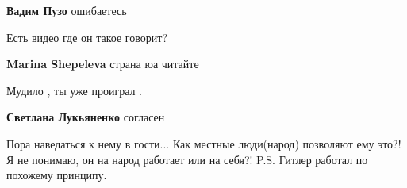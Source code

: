 \begin{itemize}
\begin{itemize}
\textbf{Вадим Пузо} ошибаетесь
\end{itemize}

 
Есть видео где он такое говорит?

\begin{itemize}
 
\textbf{Marina Shepeleva} страна юа читайте
\end{itemize}

 
Мудило , ты уже проиграл .

\begin{itemize}
 
\textbf{Светлана Лукьяненко} согласен
\end{itemize}

 

Пора наведаться к нему в гости... Как местные люди(народ) позволяют ему это?! Я
не понимаю, он на народ работает или на себя?! P.S. Гитлер работал по похожему
принципу.

\begin{itemize}
 

\end{itemize}
\end{itemize}
